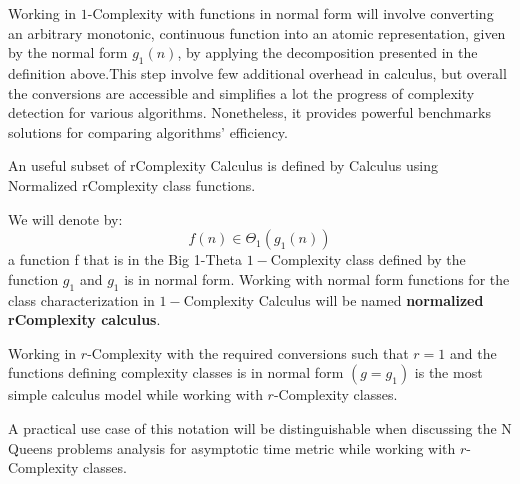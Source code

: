 \begin{remark}
    Working in $1$-Complexity with functions in normal form will involve converting an arbitrary monotonic, continuous function into an atomic representation, given by the normal form $g_{1}(n)$, by applying the decomposition presented in the definition above.This step involve few additional overhead in calculus, but overall the conversions are accessible and simplifies a lot the progress of complexity detection for various algorithms. Nonetheless, it provides powerful benchmarks solutions for comparing algorithms' efficiency.
\end{remark}

An useful subset of rComplexity Calculus is defined by Calculus using Normalized rComplexity class functions.
\begin{definition}
    We will denote by:
    \[ f(n) \in \Theta_{1}(g_{1}(n)) \]
    a function f that is in the Big 1-Theta $1-$Complexity class defined by the function $g_{1}$ and $g_{1}$ is in normal form. Working with normal form functions for the class characterization in $1-$Complexity Calculus will be named \textbf{normalized rComplexity calculus}.
\end{definition}

\begin{remark}
    Working in $r$-Complexity with the required conversions such that $r = 1$ and the functions defining complexity classes is in normal form $(g = g_{1})$ is the most simple
    calculus model while working with $r$-Complexity classes.
\end{remark}


\begin{remark}
    A practical use case of this notation will be distinguishable when discussing the N Queens problems analysis for asymptotic time metric while working with $r$-Complexity classes.
\end{remark}